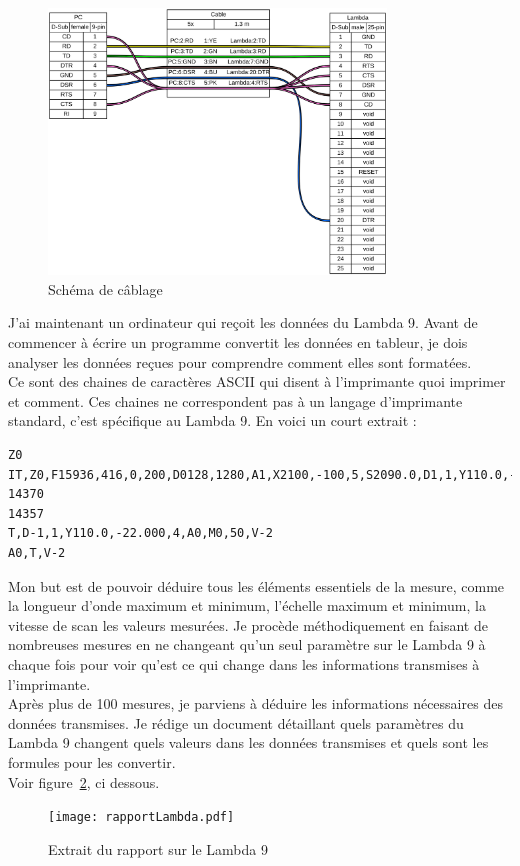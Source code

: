 \documentclass[12pt]{article}
\begin{document}
\begin{figure}[h]
	\centering
	\includegraphics[width=0.8\textwidth]{cableLambda}
	\caption{Schéma de câblage}
	\label{fig:schemaCable}
\end{figure}


\FloatBarrier
J'ai maintenant un ordinateur qui reçoit les données du Lambda 9.
Avant de commencer à écrire un programme convertit les données en tableur, je dois analyser les données reçues pour comprendre comment elles sont formatées.\\
Ce sont des chaines de caractères ASCII qui disent à l'imprimante quoi imprimer et comment.
Ces chaines ne correspondent pas à un langage d'imprimante standard, c'est spécifique au Lambda 9.
En voici un court extrait :
\begin{lstlisting}
Z0
IT,Z0,F15936,416,0,200,D0128,1280,A1,X2100,-100,5,S2090.0,D1,1,Y110.0,-22.000,4,Z0,D0128,1280,L1
14370
14357
T,D-1,1,Y110.0,-22.000,4,A0,M0,50,V-2
A0,T,V-2
\end{lstlisting}
Mon but est de pouvoir déduire tous les éléments essentiels de la mesure, comme la longueur d'onde maximum et minimum, l'échelle maximum et minimum, la vitesse de scan les valeurs mesurées.
Je procède méthodiquement en faisant de nombreuses mesures en ne changeant qu'un seul paramètre sur le Lambda 9 à chaque fois pour voir qu'est ce qui change dans les informations transmises à l'imprimante.\\
Après plus de 100 mesures, je parviens à déduire les informations nécessaires des données transmises.
Je rédige un document détaillant quels paramètres du Lambda 9 changent quels valeurs dans les données transmises et quels sont les formules pour les convertir.\\
Voir figure~\ref{fig:rapportLambda}, ci dessous.
\begin{figure}[H] 
    \centering
    \texttt{[image: rapportLambda.pdf]} 
    \caption{Extrait du rapport sur le Lambda 9}
    \label{fig:rapportLambda}
\end{figure}
\end{document}
